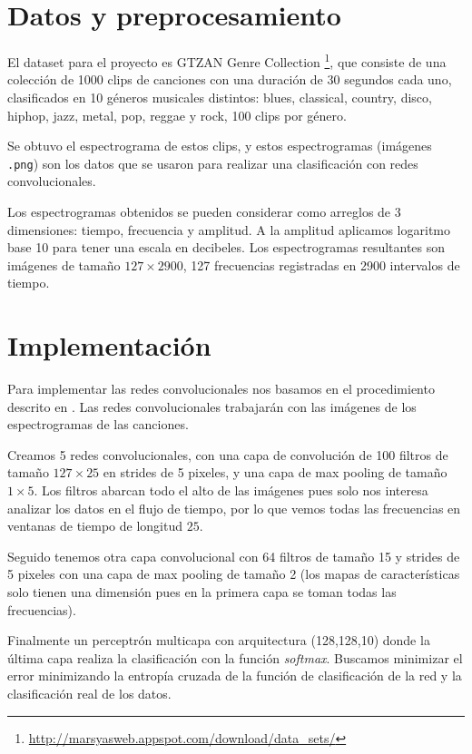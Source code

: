 \documentclass[spanish,11pt,letterpaper]{article}
\begin{document}
\section{Datos y preprocesamiento}

El dataset para el proyecto es \textsf{GTZAN Genre Collection}%
\footnote{\url{http://marsyasweb.appspot.com/download/data_sets/}}, que consiste de
una colección de 1000 clips de canciones con una duración de 30 segundos cada uno,
clasificados en 10 géneros musicales distintos: blues, classical, country, disco,
hiphop, jazz, metal, pop, reggae y rock, 100 clips por género.

Se obtuvo el espectrograma de estos clips, y estos espectrogramas (imágenes
\texttt{.png}) son los datos que se usaron para realizar una clasificación con
redes convolucionales.

Los espectrogramas obtenidos se pueden considerar como arreglos de 3 dimensiones: tiempo, frecuencia
y amplitud. A la amplitud aplicamos logaritmo base 10 para tener una escala en
decibeles. Los espectrogramas resultantes son imágenes de tamaño $127 \times 2900$,
127 frecuencias registradas en 2900 intervalos de tiempo.

\section{Implementación}

Para implementar las redes convolucionales nos basamos en el procedimiento descrito
en \cite{audio_recognition}. Las redes convolucionales trabajarán con las
imágenes de los espectrogramas de las canciones.

Creamos 5 redes convolucionales, con una capa de convolución de 100 filtros de
tamaño $127 \times 25$ en strides de 5 pixeles, y una capa de max pooling de tamaño
$1 \times 5$. Los filtros abarcan todo el alto de las imágenes pues solo
nos interesa analizar los datos en el flujo de tiempo, por lo que vemos todas
las frecuencias en ventanas de tiempo de longitud $25$.

Seguido tenemos otra capa convolucional con 64 filtros de tamaño 15 y strides de
5 pixeles con una capa de max pooling de tamaño 2 (los mapas de características
solo tienen una dimensión pues en la primera capa se toman todas las frecuencias).

Finalmente un perceptrón multicapa con arquitectura (128,128,10) donde la última
capa realiza la clasificación con la función \textit{softmax}. Buscamos minimizar
el error minimizando la entropía cruzada de la función de clasificación de la red
y la clasificación real de los datos.
\end{document}

